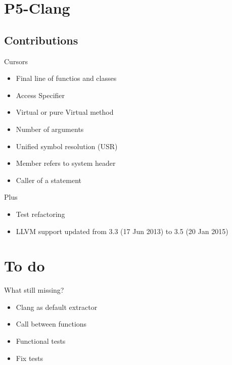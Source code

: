 \section{P5-Clang} %
\label{sec:p5_clang}

\subsection*{Contributions}
\begin{frame}{Cursors}
    \begin{itemize} 
        \item Final line of functios and classes  
        \item Access Specifier
        \item Virtual or pure Virtual method
        \item Number of arguments
        \item Unified symbol resolution (USR)
        \item Member refers to system header
        \item Caller of a statement 
    \end{itemize}
\end{frame}

\begin{frame}{Plus}

\begin{itemize}
    \item Test refactoring
    \item LLVM support updated from 3.3 (17 Jun 2013) to 3.5 (20 Jan 2015)
\end{itemize}
    
\end{frame}

\section{To do} %
\label{sec:analizo}

\begin{frame}{What still missing?}
    \begin{itemize} 
        \item Clang as default extractor
        \item Call between functions   
        \item Functional tests
        \item Fix tests
    \end{itemize}
\end{frame}
